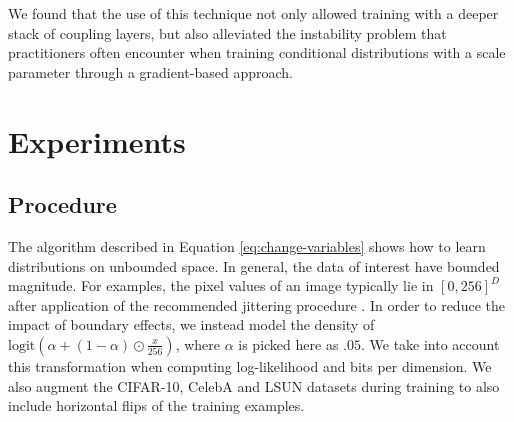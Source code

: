 \documentclass{article}
\newcommand{\jcom}[1]{\textcolor{darkgreen}{[jascha: #1]}}
\begin{document}
We found that the use of this technique not only allowed training with a deeper stack of coupling layers, but also alleviated the instability problem that practitioners often encounter when training conditional distributions with a scale parameter through a gradient-based approach.

\section{Experiments}
\subsection{Procedure}
The algorithm described in Equation \ref{eq:change-variables} shows how to learn distributions on unbounded space. In general, the data of interest have bounded magnitude. For examples, the pixel values of an image typically lie in $[0, 256]^{D}$ after application of the recommended jittering procedure \citep{uria2013rnade, DBLP:journals/corr/TheisOB15}. In order to reduce the impact of boundary effects, we instead model the density of $\mbox{logit}(\alpha + (1 - \alpha) \odot \frac{x}{256})$, where $\alpha$ is picked here as $.05$.
We take into account this transformation when computing log-likelihood and bits per dimension. We also augment the CIFAR-10, CelebA and LSUN datasets during training to also include horizontal flips of the training examples. %
\end{document}
